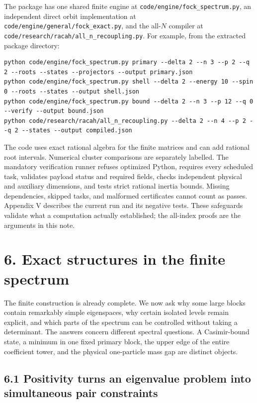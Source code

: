 The package has one shared finite engine at \texttt{code/engine/fock\_spectrum.py}, an independent direct orbit implementation at \texttt{code/engine/general/fock\_exact.py}, and the all-\(N\) compiler at \texttt{code/research/racah/all\_n\_recoupling.py}. For example, from the extracted package directory:

\begin{verbatim}
python code/engine/fock_spectrum.py primary --delta 2 --n 3 --p 2 --q 2 --roots --states --projectors --output primary.json
python code/engine/fock_spectrum.py shell --delta 2 --energy 10 --spin 0 --roots --states --output shell.json
python code/engine/fock_spectrum.py bound --delta 2 --n 3 --p 12 --q 0 --verify --output bound.json
python code/research/racah/all_n_recoupling.py --delta 2 --n 4 --p 2 --q 2 --states --output compiled.json
\end{verbatim}

The code uses exact rational algebra for the finite matrices and can add rational root intervals. Numerical cluster comparisons are separately labelled. The mandatory verification runner refuses optimized Python, requires every scheduled task, validates payload status and required fields, checks independent physical and auxiliary dimensions, and tests strict rational inertia bounds. Missing dependencies, skipped tasks, and malformed certificates cannot count as passes. Appendix V describes the current run and its negative tests. These safeguards validate what a computation actually established; the all-index proofs are the arguments in this note.

\clearpage
\hypertarget{exact-structures-in-the-finite-spectrum}{%
\section{6. Exact structures in the finite spectrum}\label{exact-structures-in-the-finite-spectrum}}

The finite construction is already complete. We now ask why some large blocks contain remarkably simple eigenspaces, why certain isolated levels remain explicit, and which parts of the spectrum can be controlled without taking a determinant. The answers concern different spectral questions. A Casimir-bound state, a minimum in one fixed primary block, the upper edge of the entire coefficient tower, and the physical one-particle mass gap are distinct objects.

\hypertarget{positivity-turns-an-eigenvalue-problem-into-simultaneous-pair-constraints}{%
\subsection{6.1 Positivity turns an eigenvalue problem into simultaneous pair constraints}\label{positivity-turns-an-eigenvalue-problem-into-simultaneous-pair-constraints}}

